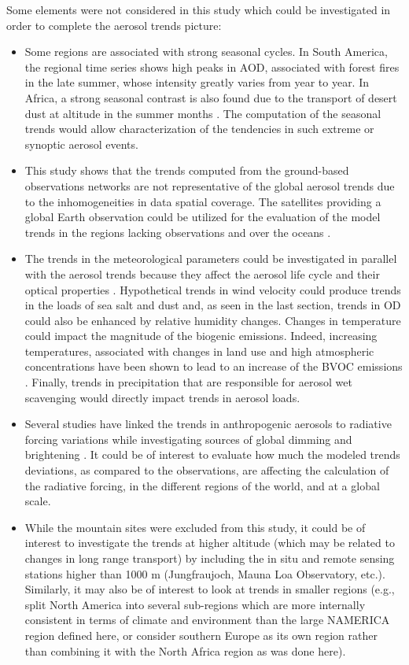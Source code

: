 \documentclass[acp, manuscript]{copernicus}
\begin{document}
Some elements were not considered in this study which could be investigated in order to complete the aerosol trends picture:
\begin{itemize}
 \item Some regions are associated with strong seasonal cycles. In South America, the regional time series shows high peaks in AOD, associated with forest fires in the late summer, whose intensity greatly varies from year to year. In Africa, a strong seasonal contrast is also found due to the transport of desert dust at altitude in the summer months \citep{mortier2016, ogunjobi2008synoptic}. The computation of the seasonal trends would allow characterization of the tendencies in such extreme or synoptic aerosol events.
 \item  This study shows that the trends computed from the ground-based observations networks are not representative of the global aerosol trends due to the inhomogeneities in data spatial coverage. The satellites providing a global Earth observation could be utilized for the evaluation of the model trends in the regions lacking observations and over the oceans \citep{hsu2012global,zhang2010decadal}.
 \item The trends in the meteorological parameters could be investigated in parallel with the aerosol trends because they affect the aerosol life cycle and their optical properties \citep{che2019large}. Hypothetical trends in wind velocity could produce trends in the loads of sea salt and dust and, as seen in the last section, trends in OD could also be enhanced by relative humidity changes. Changes in temperature could impact the magnitude of the biogenic emissions. Indeed, increasing temperatures, associated with changes in land use and high atmospheric  concentrations have been shown to lead to an increase of the BVOC emissions \citep{penuelas2010bvocs}. Finally, trends in precipitation that are responsible for aerosol wet scavenging would directly impact trends in aerosol loads.
 \item Several studies have linked the trends in anthropogenic aerosols to radiative forcing variations while investigating sources of global dimming and brightening \citep{streets2006two,norris2007trends}. It could be of interest to evaluate how much the modeled trends deviations, as compared to the observations, are affecting the calculation of the radiative forcing, in the different regions of the world, and at a global scale.
 \item While the mountain sites were excluded from this study, it could be of interest to investigate the trends at higher altitude (which may be related to changes in long range transport) by including the in situ and remote sensing stations higher than 1000 m (Jungfraujoch, Mauna Loa Observatory, etc.). Similarly, it may also be of interest to look at trends in smaller regions (e.g., split North America into several sub-regions which are more internally consistent in terms of climate and environment than the large NAMERICA region defined here, or consider southern Europe as its own region rather than combining it with the North Africa region as was done here).
\end{itemize}
\end{document}
